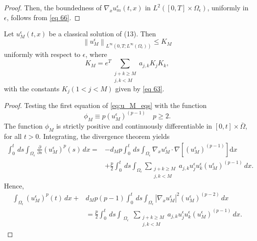 \begin{proof}
Then, the boundedness of $\nabla_{x} u_{m}^{\epsilon}(t, x)$ in $L^{2}\left([0, T] \times \Omega_{\epsilon}\right)$, uniformly in $\epsilon$, follows from \eqref{eq 66}.
\end{proof}
\begin{lemma} Let $u_{M}^{\epsilon}(t, x)$ be a classical solution of (13). Then
$$
\left\|u_{M}^{\epsilon}\right\|_{L^{\infty}\left(0, T ; L^{\infty}\left(\Omega_{\epsilon}\right)\right)} \leq K_{M}
$$
uniformly with respect to $\epsilon$, where
$$
K_{M}=e^{T} \sum_{\substack{j+k \geq M \\
j,k<M}} a_{j, k} K_{j} K_{k},
$$
with the constants $K_{j}(1<j<M)$ given by \eqref{eq 63}.
\label{lemma 5.7}\end{lemma}
\begin{proof}
Testing the first equation of \eqref{eq:u_M_eqs} with the function
$$
\phi_{M} \equiv p\left(u_{M}^{\epsilon}\right)^{(p-1)} \quad p \geq 2 .
$$
The function $\phi_{M}$ is strictly positive and continuously differentiable in $[0, t] \times \bar{\Omega}$, for all $t>0$. Integrating, the divergence theorem yields
\begin{equation}
  \begin{aligned}
\int_{0}^{t} \, d  s \int_{\Omega_{\epsilon}} \frac{\partial}{\partial s}\left(u_{M}^{\epsilon}\right)^{p}(s) \, {d} x=&-d_{M} p \int_{0}^{t} \, d  s \int_{\Omega_{\epsilon}} \nabla_{x} u_{M}^{\epsilon} \cdot \nabla\left[\left(u_{M}^{\epsilon}\right)^{(p-1)}\right] \mathrm{d} x \\
&+\frac{p}{2} \int_{0}^{t} \, d  s \int_{\Omega_{\epsilon}} \sum_{\substack{j+k \geq M \\
j,k<M}} a_{j, k} u_{j}^{\epsilon} u_{k}^{\epsilon}\left(u_{M}^{\epsilon}\right)^{(p-1)} \, {d} x.
\end{aligned}
\label{eq 69}\end{equation}
Hence,
\begin{equation}
  \begin{aligned}
\int_{\Omega_{\epsilon}}\left(u_{M}^{\epsilon}\right)^{p}(t) \, {d} x+& d_{M} p(p-1) \int_{0}^{t} \, d  s \int_{\Omega_{\epsilon}}\left|\nabla_{x} u_{M}^{\epsilon}\right|^{2}\left(u_{M}^{\epsilon}\right)^{(p-2)} \, {d} x \\
&=\frac{p}{2} \int_{0}^{t} \, d  s \int_{\substack{\Omega_{\epsilon}}} \sum_{\substack{j+k \geq M \\
j,k<M}} a_{j, k} u_{j}^{\epsilon} u_{k}^{\epsilon}\left(u_{M}^{\epsilon}\right)^{(p-1)} \, {d} x.
\end{aligned}
\label{eq 70}\end{equation}

\end{proof}
